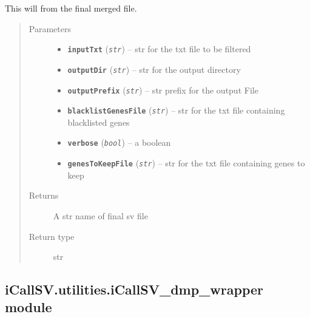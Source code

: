 \documentclass[letterpaper,10pt,english]{sphinxmanual}
\begin{document}
\begin{fulllineitems}
\label{iCallSV:iCallSV.filterAnnotatedSV.run}
This will  from the final merged file.
\begin{quote}\begin{description}
\item[{Parameters}] \leavevmode\begin{itemize}
\item {} 
\textbf{\texttt{inputTxt}} (\emph{\texttt{str}}) -- str for the txt file to be filtered

\item {} 
\textbf{\texttt{outputDir}} (\emph{\texttt{str}}) -- str for the output directory

\item {} 
\textbf{\texttt{outputPrefix}} (\emph{\texttt{str}}) -- str prefix for the output File

\item {} 
\textbf{\texttt{blacklistGenesFile}} (\emph{\texttt{str}}) -- str for the txt file containing blacklisted genes

\item {} 
\textbf{\texttt{verbose}} (\emph{\texttt{bool}}) -- a boolean

\item {} 
\textbf{\texttt{genesToKeepFile}} (\emph{\texttt{str}}) -- str for the txt file containing genes to keep

\end{itemize}

\item[{Returns}] \leavevmode
A str name of final sv file

\item[{Return type}] \leavevmode
str

\end{description}\end{quote}

\end{fulllineitems}



\subsection{iCallSV.utilities.iCallSV\_dmp\_wrapper module}
\label{iCallSV:icallsv-utilities-icallsv-dmp-wrapper-module}
\end{document}
